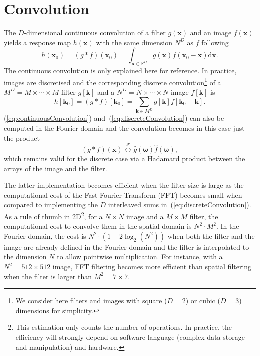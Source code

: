 \documentclass[fleqn,a4paper,oneside,openany]{book}
\begin{document}
\chapter{Convolution}\label{sec:convolution}
%
The $D$-dimensional continuous convolution of a filter $g(\boldsymbol{x})$ and an image $f(\boldsymbol{x})$ yields a response map $h(\boldsymbol{x})$ with the same dimension $N^D$ as $f$ following
%
\begin{equation}\label{eq:continuousConvolution}
h(\boldsymbol{x}_0)=(g\ast f)(\boldsymbol{x}_0)=
\int_{\boldsymbol{x}\in\mathbb{R}^D}
g(\boldsymbol{x})f(\boldsymbol{x}_0-\boldsymbol{x})
\mathrm{d}\boldsymbol{x}.
\end{equation}
%
The continuous convolution is only explained here for reference. 
In practice, images are discretised and the corresponding discrete convolution\footnote{We consider here filters and images with square ($D=2$) or cubic ($D=3$) dimensions for simplicity.} of a $M^D=M\times\cdots\times M$ filter $g[\boldsymbol{k}]$ and a $N^D=N\times\cdots\times N$  image $f[\boldsymbol{k}]$ is
%
\begin{equation}\label{eq:discreteConvolution}
h[\boldsymbol{k}_0]=(g\ast f)[\boldsymbol{k}_0]=
\sum_{\boldsymbol{k}\in M^D}
g[\boldsymbol{k}]f[\boldsymbol{k}_0-\boldsymbol{k}].
\end{equation}
%
(\ref{eq:continuousConvolution}) and~(\ref{eq:discreteConvolution}) can also be computed in the Fourier domain and the convolution becomes in this case just the product
%
\begin{equation}\label{eq:convolutionFFT}
(g \ast f) (\boldsymbol{x})  \overset{\mathcal{F}}{\longleftrightarrow}   \hat{g}(\boldsymbol{\omega}) \hat{f}(\boldsymbol{\omega}),
\end{equation}
%
which remains valid for the discrete case via a Hadamard product between the arrays of the image and the filter.

The latter implementation becomes efficient when the filter size is large as the computational cost of the Fast Fourier Transform (FFT) becomes small when compared to implementing the $D$ interleaved sums in~(\ref{eq:discreteConvolution}).
As a rule of thumb in 2D\footnote{This estimation only counts the number of operations. In practice, the efficiency will strongly depend on software language (complex data storage and manipulation) and hardware.}, for a $N\times N$ image and a $M\times M$ filter, the computational cost to convolve them in the spatial domain is $N^2 \cdot M^2$.
In the Fourier domain, the cost is $N^2\cdot(1+2\log_2(N^2))$ when both the filter and the image are already defined in the Fourier domain and the filter is interpolated to the dimension $N$ to allow pointwise multiplication.
For instance, with a $N^2=512\times 512$ image, FFT filtering becomes more efficient than spatial filtering when the filter is larger than $M^2=7\times 7$.
\end{document}
